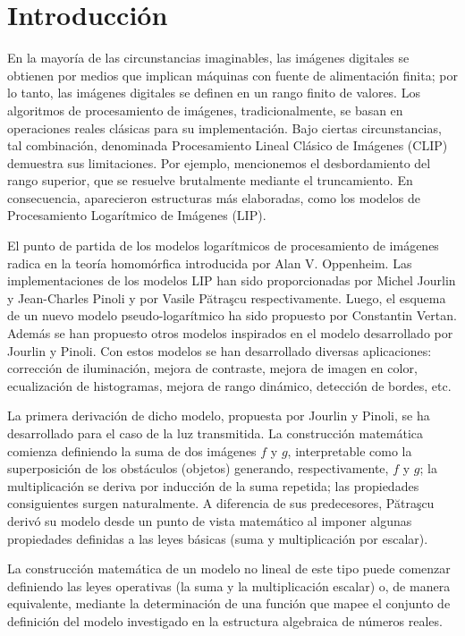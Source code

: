 \chapter*{Introducción}\label{chapter:introduction}

En la mayoría de las circunstancias imaginables, las imágenes digitales se obtienen por medios que implican máquinas con fuente de alimentación finita; por lo tanto, las imágenes digitales se definen en un rango finito de valores. Los algoritmos de procesamiento de imágenes, tradicionalmente, se basan en operaciones reales clásicas para su implementación. Bajo ciertas circunstancias, tal combinación, denominada Procesamiento Lineal Clásico de Imágenes (CLIP) demuestra sus limitaciones. Por ejemplo, mencionemos el desbordamiento del rango superior, que se resuelve brutalmente mediante el truncamiento. En consecuencia, aparecieron estructuras más elaboradas, como los modelos de Procesamiento Logarítmico de Imágenes (LIP).

El punto de partida de los modelos logarítmicos de procesamiento de imágenes radica en la teoría homomórfica introducida por Alan V. Oppenheim. Las implementaciones de los modelos LIP han sido proporcionadas por Michel Jourlin y Jean-Charles Pinoli  y por Vasile Pătraşcu respectivamente. Luego, el esquema de un nuevo modelo pseudo-logarítmico ha sido propuesto por Constantin Vertan. Adem\'as se han propuesto otros modelos inspirados en el modelo desarrollado por Jourlin y Pinoli. Con estos modelos se han desarrollado diversas aplicaciones: corrección de iluminación, mejora de contraste, mejora de imagen en color, ecualización de histogramas, mejora de rango dinámico, detección de bordes, etc.

La primera derivación de dicho modelo, propuesta por Jourlin y Pinoli, se ha desarrollado para el caso de la luz transmitida. La construcción matemática comienza definiendo la suma de dos imágenes $f$ y $g$, interpretable como la superposición de los obstáculos (objetos) generando, respectivamente, $f$ y $g$; la multiplicación se deriva por inducción de la suma repetida; las propiedades consiguientes surgen naturalmente. A diferencia de sus predecesores, Pătraşcu derivó su modelo desde un punto de vista matemático al imponer algunas propiedades definidas a las leyes básicas (suma y multiplicación por escalar).

La construcción matemática de un modelo no lineal de este tipo puede comenzar definiendo las leyes operativas (la suma y la multiplicación escalar) o, de manera equivalente, mediante la determinación de una función que mapee el conjunto de definición del modelo investigado en la estructura algebraica de números reales.

